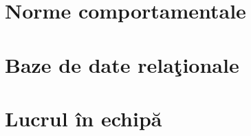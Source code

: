 \section{Norme comportamentale}


\section{Baze de date relaţionale}

% 
% 
% 
% 
% 

\section{Lucrul în echipă}
% 
% 
% 
